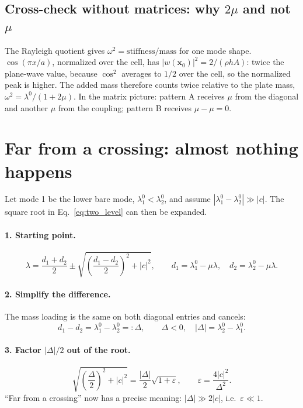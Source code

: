 \subsection{Cross-check without matrices: why $2\mu$ and not $\mu$}
The Rayleigh quotient gives $\omega^2 = \text{stiffness}/\text{mass}$ for one
mode shape. $\cos(\pi x/a)$, normalized over the cell, has
$|w(\mathbf{x}_0)|^2 = 2/(\rho h A)$: twice the plane-wave value, because
$\cos^2$ averages to $1/2$ over the cell, so the normalized peak is higher.
The added mass therefore counts twice relative to the plate mass,
$\omega^2 = \lambda^0/(1+2\mu)$. In the matrix picture: pattern A receives
$\mu$ from the diagonal and another $\mu$ from the coupling; pattern B
receives $\mu - \mu = 0$.

\section{Far from a crossing: almost nothing happens}
\label{sec:far}

Let mode 1 be the lower bare mode, $\lambda_1^0 < \lambda_2^0$, and assume
$|\lambda_1^0 - \lambda_2^0| \gg |c|$. The square root in
Eq.~\eqref{eq:two_level} can then be expanded.

\paragraph{1. Starting point.}
\begin{equation}
  \lambda = \frac{d_1 + d_2}{2} \pm \sqrt{\left(\frac{d_1 - d_2}{2}\right)^2 + |c|^2},
  \qquad d_1 = \lambda_1^0 - \mu\lambda, \quad d_2 = \lambda_2^0 - \mu\lambda .
\end{equation}

\paragraph{2. Simplify the difference.}
The mass loading is the same on both diagonal entries and cancels:
\begin{equation}
  d_1 - d_2 = \lambda_1^0 - \lambda_2^0 =: \Delta, \qquad \Delta < 0, \quad |\Delta| = \lambda_2^0 - \lambda_1^0 .
\end{equation}

\paragraph{3. Factor $|\Delta|/2$ out of the root.}
\begin{equation}
  \sqrt{\left(\frac{\Delta}{2}\right)^2 + |c|^2} = \frac{|\Delta|}{2}\sqrt{1 + \varepsilon},
  \qquad \varepsilon = \frac{4|c|^2}{\Delta^2} .
\end{equation}
``Far from a crossing'' now has a precise meaning: $|\Delta| \gg 2|c|$, i.e.\
$\varepsilon \ll 1$.

